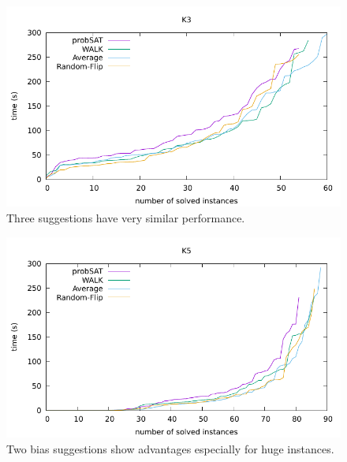 \documentclass[12pt,a4paper,twoside]{scrartcl}
\numberwithin{equation}{section}
\begin{document}
\begin{figure}[H]
\begin{center}
  \includegraphics[scale = 1]{DATA/K3/e2.pdf}
  \end{center}
  \caption{Three suggestions have very similar performance.}
  \label{Experiment 2 k3 cactus plot}
  \end{figure}
  \begin{figure}[H]
\begin{center}
  \includegraphics[scale = 1]{DATA/K5/e2.pdf}
  \end{center}
  \caption{Two bias suggestions show advantages especially for huge instances.}
  \label{Experiment 2 k5 cactus plot}
  \end{figure}
\end{document}
